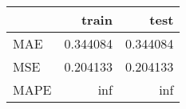 \begin{tabular}{lrr}
\toprule
{} &     train &      test \\
\midrule
MAE  &  0.344084 &  0.344084 \\
MSE  &  0.204133 &  0.204133 \\
MAPE &       inf &       inf \\
\bottomrule
\end{tabular}

